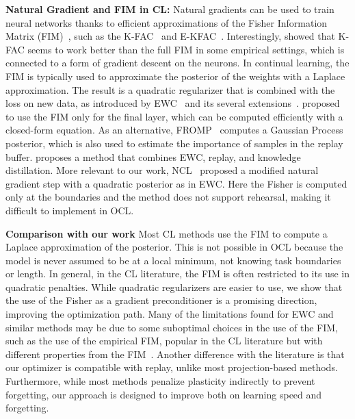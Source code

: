 \textbf{Natural Gradient and FIM in CL:} Natural gradients can be used to train neural networks thanks to efficient approximations of the Fisher Information Matrix (FIM)~\cite{martens2012training}, such as the K-FAC~\cite{martens2020new} and E-KFAC~\cite{DBLP:conf/nips/GeorgeLBBV18}. Interestingly, \citet{DBLP:conf/icml/Benzing22} showed that K-FAC seems to work better than the full FIM in some empirical settings, which is connected to a form of gradient descent on the neurons. In continual learning, the FIM is typically used to approximate the posterior of the weights with a Laplace approximation. The result is a quadratic regularizer that is combined with the loss on new data, as introduced by EWC~\cite{kirkpatrick2017overcoming} and its several extensions~\cite{DBLP:conf/eccv/ChaudhryDAT18,liu2018rotate,DBLP:journals/corr/abs-1712-03847}. \citet{DBLP:conf/iclr/MagistriTS0B24} proposed to use the FIM only for the final layer, which can be computed efficiently with a closed-form equation. As an alternative, FROMP~\cite{pan2020continual} computes a Gaussian Process posterior, which is also used to estimate the importance of samples in the replay buffer. \citet{daxberger2023improving} proposes a method that combines EWC, replay, and knowledge distillation. More relevant to our work, NCL~\cite{DBLP:conf/nips/KaoJVBH21} proposed a modified natural gradient step with a quadratic posterior as in EWC. Here the Fisher is computed only at the boundaries and the method does not support rehearsal, making it difficult to implement in OCL.

\textbf{Comparison with our work} Most CL methods use the FIM to compute a Laplace approximation of the posterior. This is not possible in OCL because the model is never assumed to be at a local minimum, not knowing task boundaries or length. In general, in the CL literature, the FIM is often restricted to its use in quadratic penalties. While quadratic regularizers are easier to use, we show that the use of the Fisher as a gradient preconditioner is a promising direction, improving the optimization path. Many of the limitations found for EWC and similar methods may be due to some suboptimal choices in the use of the FIM, such as the use of the empirical FIM, popular in the CL literature but with different properties from the FIM~\cite{kunstner2019limitations}. Another difference with the literature is that our optimizer is compatible with replay, unlike most projection-based methods. Furthermore, while most methods penalize plasticity indirectly to prevent forgetting, our approach is designed to improve both on learning speed and forgetting.